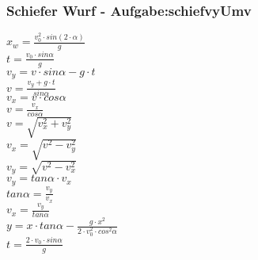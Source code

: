 \subsubsection{Schiefer Wurf  - Aufgabe:schiefvyUmv} 
\begin{minipage}{0.45\textwidth} 
$ x_{w}  = \frac{v_{0} ^{2} \cdot sin(2\cdot \alpha )}{       g} $\\ 
$ t =\frac{v_{0} \cdot sin \alpha }{  g} $\\ 
$ v_{y}  =  v\cdot sin\alpha - g\cdot t $\\ 
$ v= \frac{ v_{y} +g\cdot t}{ sin\alpha } $\\ 
$ v_{x}  = v\cdot  cos\alpha $\\ 
$ v= \frac{ v_{x} }{ cos\alpha } $\\ 
$ v= \sqrt{ v_{x} ^{2} + v_{y} ^{2} } $\\ 
$ v_{x} = \sqrt{ v^{2}  - v_{y} ^{2} } $\\ 
$ v_{y} = \sqrt{ v^{2}  - v_{x} ^{2} } $\\ 
$ v_{y} = tan \alpha \cdot  v_{x} $\\ 
$ tan \alpha = \frac{v_{y} }{v_{x} } $\\ 
$ v_{x} = \frac{v_{y} }{tan \alpha } $\\ 
$ y = x\cdot tan \alpha  - \frac{   g\cdot x^{2} }{2\cdot v^{2} _{0} \cdot cos ^{2}\alpha } $\\ 
$ t =\frac{2\cdot v_{0} \cdot sin \alpha }{ g} $\\ 
\end{minipage} 
\begin{minipage}{0.45\textwidth} 
 
\end{minipage} 
